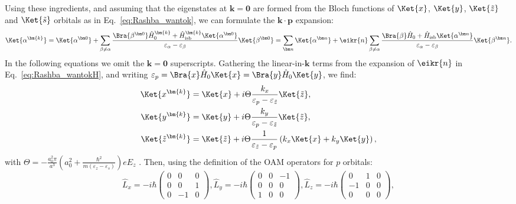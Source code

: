Using these ingredients, and assuming that the eigenstates at $\bm k = \bm 0$ are formed from the Bloch functions of $\Ket{x}$, $\Ket{y}$, $\Ket{\tilde{z}}$ and $\Ket{\tilde{s}}$ orbitals as in Eq.~\eqref{eq:Rashba_wantok}, we can formulate the $\bm k \cdot \bm p$ expansion:
\begin{equation}
	\label{eq:Rashba_kdotp}
	\Ket{\alpha^{\bm{k}}}=\Ket{\alpha^{\bm 0}} + \sum_{\beta \neq \alpha} \frac{\Bra{\beta^{\bm 0}} \hat{H}_0^{\bm{k}} + \hat{H}_{\rm isb}^{\bm{k}} \Ket{\alpha^{\bm 0}}}{\varepsilon_{\alpha} - \varepsilon_{\beta}} \Ket{\beta^{\bm 0}} = \sum_{\bm n} \Ket{\alpha^{\bm n}} + \eikr{n} \sum_{\beta \neq \alpha} \frac{\Bra{\beta} \hat{H}_0 + \hat{H}_{\rm isb} \Ket{\alpha^{\bm n}}}{\varepsilon_{\alpha} - \varepsilon_{\beta}} \Ket{\beta^{\bm n}}.
\end{equation}
In the following equations we omit the $\bm{k}=\bm 0$ superscripts.
Gathering the linear-in-$\bm k$ terms from the expansion of $\eikr{n}$ in Eq.~\eqref{eq:Rashba_wantokH}, and writing $\varepsilon_p = \Bra{x} \hat{H}_0 \Ket{x} = \Bra{y} \hat{H}_0 \Ket{y}$, we find:
\begin{align}
	\Ket{x^{\bm{k}}} &= \Ket{x} + i \Theta \frac{k_x}{\varepsilon_p - \varepsilon_{\tilde{z}}}\Ket{\tilde{z}}, \\
	\Ket{y^{\bm{k}}} &= \Ket{y} + i \Theta \frac{k_y}{\varepsilon_p - \varepsilon_{\tilde{z}}}\Ket{\tilde{z}},\\
	\Ket{\tilde{z}^{\bm{k}}} &= \Ket{\tilde{z}} + i \Theta \frac{1}{\varepsilon_{\tilde{z}} - \varepsilon_p} \left(k_x\Ket{x} + k_y\Ket{y}\right),
\end{align}
with $\Theta = -\frac{a_0^2 \pi}{a^3}\left(a_0^2 + \frac{\hbar^2}{m(\varepsilon_z - \varepsilon_s)}\right) e E_z$ .
Then, using the definition of the \gls{OAM} operators for $p$ orbitals:
\begin{equation}
	\hat{L}_x =-i\hbar\left(\begin{matrix}0&0&0\\0&0&1\\0&-1&0\end{matrix}\right), \hat{L}_y = -i\hbar \left(\begin{matrix}0&0&-1\\0&0&0\\1&0&0\end{matrix}\right), \hat{L}_z =-i\hbar\left(\begin{matrix}0&1&0\\-1&0&0\\0&0&0\end{matrix}\right),
\end{equation}
